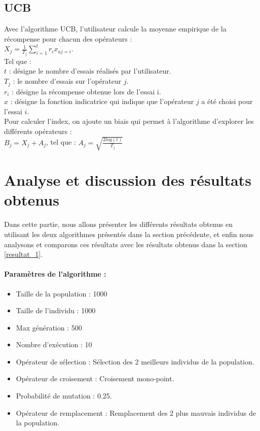 \documentclass[12pt]{article}
\begin{document}
	\subsection{UCB}
	Avec l'algorithme UCB, l'utilisateur calcule la moyenne empirique de la récompense pour chacun des opérateurs :\\
	
	 $X_j = \frac{1}{T_j} \sum_{i=1}^tr_i x_{aj=i} $.\\ 
	 
	 Tel que :\\	 
	 $t$ : désigne le nombre d'essais réalisés par l'utilisateur.\\ 
	 $T_j$ : le nombre d'essais sur l'opérateur $j$.\\ 
	 $r_i$ : désigne la récompense obtenue lors de l'essai i.\\
	 $x$ : désigne la fonction indicatrice qui indique que l'opérateur $j$ a été choisi pour l'essai $i$.\\
	 
	 Pour calculer l'index, on ajoute un biais qui permet à l'algorithme d'explorer les différents opérateurs :\\
	 $ B_j = X_j + A_j $, tel que :  $ A_j = \sqrt{\frac{2log(t)}{T_j}} $

\section{Analyse et discussion des résultats obtenus}
Dans cette partie, nous allons présenter les différents résultats obtenus en utilisant les deux algorithmes présentés dans la section précédente, et enfin nous analysons et comparons ces résultats avec les résultats obtenus dans la section \ref{resultat_1}.\\

\paragraph{Paramètres de l'algorithme : }
\begin{itemize}[label=-]
		\item{Taille de la population : } 1000
		\item{Taille de l'individu :} 1000
		\item{Max génération :} 500
		\item{Nombre d'exécution :} 10
		\item{Opérateur de sélection :} Sélection des 2 meilleurs individus de la population.
		\item{Opérateur de croisement :} Croisement mono-point.
		\item{Probabilité de mutation :} 0.25.
		\item{Opérateur de remplacement :} Remplacement des 2 plus mauvais individus de la population.
\end{itemize}
\end{document}
